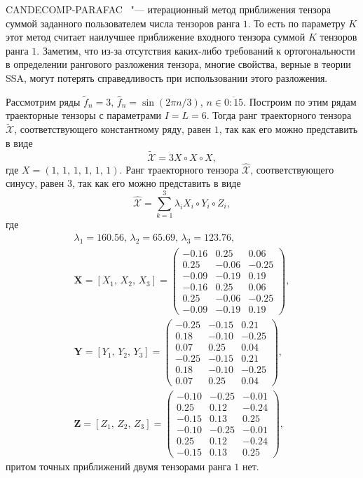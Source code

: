 \documentclass[specialist,
    substylefile = spbu_report.rtx,
    subf,href,colorlinks=true, 12pt]{disser}
\theoremstyle{plain}
\theoremstyle{definition}
\theoremstyle{remark}
\begin{document}
    CANDECOMP-PARAFAC~\cite{parafac1, parafac2} "--- итерационный метод приближения тензора суммой заданного
    пользователем числа тензоров ранга $1$.
    То есть по параметру $K$ этот метод считает наилучшее приближение входного тензора суммой $K$ тензоров ранга $1$.
    Заметим, что из-за отсутствия каких-либо требований к ортогональности в определении рангового разложения тензора,
    многие свойства, верные в теории SSA, могут потерять справедливость при использовании этого разложения.

    Рассмотрим ряды $\tilde{f}_n=3,\, \hat{f}_n=\sin(2\pi n / 3)$, $n \in \overline{0:15}$.
    Построим по этим рядам траекторные тензоры с параметрами $I=L=6$.
    Тогда ранг траекторного тензора $\tilde{\mathcal{X}}$, соответствующего константному ряду, равен $1$, так как его
    можно представить в виде
    \[
        \tilde{\mathcal{X}} = 3 X\circ X \circ X,
    \]
    где $X=(1,\, 1,\, 1,\, 1,\, 1,\, 1)$.
    Ранг траекторного тензора $\hat{\mathcal{X}}$, соответствующего синусу, равен $3$, так как его можно представить в виде
    \[
        \hat{\mathcal{X}}=\sum_{k=1}^{3}\lambda_i X_i \circ Y_i\circ Z_i,
    \]
    где
    \begin{gather*}
        \lambda_1 =160.56,\, \lambda_2 =65.69,\, \lambda_3 =123.76,\\
        \mathbf{X}=[X_1,\, X_2,\, X_3] =
        \begin{pmatrix}
            -0.16 & 0.25  & 0.06  \\
            0.25  & -0.06 & -0.25 \\
            -0.09 & -0.19 & 0.19  \\
            -0.16 & 0.25  & 0.06  \\
            0.25  & -0.06 & -0.25 \\
            -0.09 & -0.19 & 0.19
        \end{pmatrix},\\
        \mathbf{Y}=[Y_1,\, Y_2,\, Y_3] =
        \begin{pmatrix}
            -0.25 & -0.15 & 0.21  \\
            0.18  & -0.10 & -0.25 \\
            0.07  & 0.25  & 0.04  \\
            -0.25 & -0.15 & 0.21  \\
            0.18  & -0.10 & -0.25 \\
            0.07  & 0.25  & 0.04
        \end{pmatrix},\\
        \mathbf{Z}=[Z_1,\, Z_2,\, Z_3] =
        \begin{pmatrix}
            -0.10 & -0.25 & -0.01 \\
            0.25  & 0.12  & -0.24 \\
            -0.15 & 0.13  & 0.25  \\
            -0.10 & -0.25 & -0.01 \\
            0.25  & 0.12  & -0.24 \\
            -0.15 & 0.13  & 0.25
        \end{pmatrix},
    \end{gather*}
    притом точных приближений двумя тензорами ранга $1$ нет.
\end{document}

